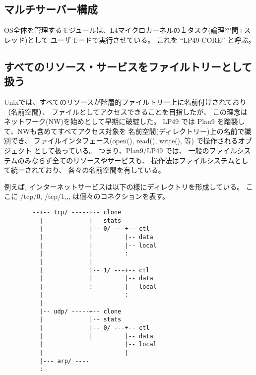 \documentclass{jarticle}
\begin{document}
\subsection{マルチサーバー構成}
 
 OS全体を管理するモジュールは、L4マイクロカーネルの１タスク(論理空間+スレッド)として
  ユーザモードで実行させている。
  これを ``LP49-CORE'' と呼ぶ。　


\subsection{すべてのリソース・サービスをファイルトリーとして扱う}

   Unixでは、すべてのリソースが階層的ファイルトリー上に名前付けされており（名前空間）、
  ファイルとしてアクセスできることを目指したが、
  この理念はネットワーク(NW)を始めとして早期に破綻した。
  LP49 では Plan9 を踏襲して、NWも含めてすべてアクセス対象を
  名前空間(ディレクトリー)上の名前で識別でき、
  ファイルインタフェース(open(), read(), write(), 等) で操作されるオブジェクト
  として扱っている。
  つまり、Plan9/LP49 では、
  一般のファイルシステムのみならず全てのリソースやサービスも、
  操作法はファイルシステムとして統一されており、
  各々の名前空間を有している。　


  例えば, インターネットサービスは以下の様にディレクトリを形成している。
  ここに /tcp/0, /tcp/1,,, は個々のコネクションを表す。

{\footnotesize
\begin{verbatim}
        --+-- tcp/ -----+-- clone                               
          |             |-- stats                       
          |             |-- 0/ ---+-- ctl                
          |             |         |-- data          
          |             |         |-- local         
          |             |         :
          |             |
          |             |-- 1/ ---+-- ctl                
          |             |         |-- data          
          |             :         |-- local         
          |                       :
          |                
          |-- udp/ -----+-- clone                             
          |             |-- stats                       
          |             |-- 0/ ---+-- ctl                
          |             |         |-- data          
          |                       |-- local         
          |                       |                
          |--- arp/ ----
          :
\end{verbatim}
}
\end{document}
